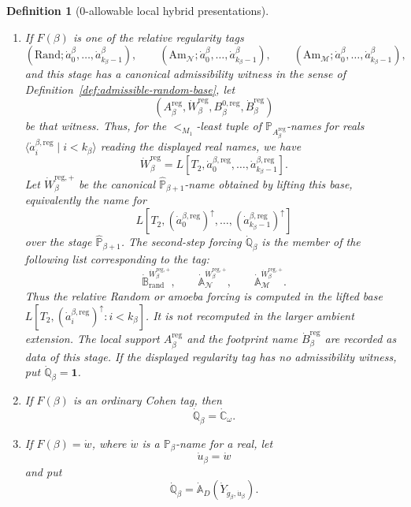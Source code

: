 \documentclass[10pt,a4paper]{amsart}
\newtheorem{definition}{Definition}
\begin{document}
\begin{definition}[\(0\)-allowable local hybrid presentations]
\begin{enumerate}
   \item If \(F(\beta)\) is one of the relative regularity tags
   \[
      (\mathrm{Rand};\dot a^\beta_0,\ldots,
         \dot a^\beta_{k_\beta-1}),
      \qquad
      (\mathrm{Am}_{\mathcal N};\dot a^\beta_0,\ldots,
         \dot a^\beta_{k_\beta-1}),
      \qquad
      (\mathrm{Am}_{\mathcal M};\dot a^\beta_0,\ldots,
         \dot a^\beta_{k_\beta-1}),
   \]
   and this stage has a canonical admissibility witness in the sense of
   Definition~\ref{def:admissible-random-base}, let
   \[
      (A^{\mathrm{reg}}_\beta,
       \dot W^{\mathrm{reg}}_\beta,
       B^{0,\mathrm{reg}}_\beta,
       \dot B^{\mathrm{reg}}_\beta)
   \]
   be that witness.  Thus, for the \(<_{M_1}\)-least tuple of
   \(\mathbb P_{A^{\mathrm{reg}}_\beta}\)-names for reals
   \(\langle\dot a^{\beta,\mathrm{reg}}_i\mid i<k_\beta\rangle\) reading the
   displayed real names, we have
   \[
      \dot W^{\mathrm{reg}}_\beta
      =L[T_2,
          \dot a^{\beta,\mathrm{reg}}_0,
          \ldots,
          \dot a^{\beta,\mathrm{reg}}_{k_\beta-1}].
   \]
   Let \(\dot W^{\mathrm{reg},+}_\beta\) be the canonical
   \(\widehat{\mathbb P}_{\beta+1}\)-name obtained by lifting this base, equivalently
   the name for
   \[
      L[T_2,
        (\dot a^{\beta,\mathrm{reg}}_0)^{\uparrow},\ldots,
        (\dot a^{\beta,\mathrm{reg}}_{k_\beta-1})^{\uparrow}]
   \]
   over the stage \(\widehat{\mathbb P}_{\beta+1}\).  The second-step forcing
   \(\dot{\mathbb Q}_\beta\) is the member of the following list corresponding
   to the tag:
   \[
      \dot{\mathbb B}_{\mathrm{rand}}^{\dot W^{\mathrm{reg},+}_\beta},
      \qquad
      \dot{\mathbb A}_{\mathcal N}^{\dot W^{\mathrm{reg},+}_\beta},
      \qquad
      \dot{\mathbb A}_{\mathcal M}^{\dot W^{\mathrm{reg},+}_\beta}.
   \]
   Thus the relative Random or amoeba forcing is computed in the lifted base
   \(L[T_2,(\dot a^{\beta,\mathrm{reg}}_i)^{\uparrow}:i<k_\beta]\).  It is not
   recomputed in the larger ambient extension.  The local support
   \(A^{\mathrm{reg}}_\beta\) and the footprint name
   \(\dot B^{\mathrm{reg}}_\beta\) are recorded as data of this stage.  If the
   displayed regularity tag has no admissibility witness, put
   \(\dot{\mathbb Q}_\beta=\mathbf 1\).

   \item If \(F(\beta)\) is an ordinary Cohen tag, then
   \[
      \dot{\mathbb Q}_\beta=\dot{\mathbb C}_\omega.
   \]

   \item If \(F(\beta)=\dot w\), where \(\dot w\) is a
   \(\mathbb P_\beta\)-name for a real, let
   \[
      \dot u_\beta=\dot w
   \]
   and put
   \[
      \dot{\mathbb Q}_\beta
      =
      \dot{\mathbb A}_D(\dot Y_{\dot g_\beta,\dot u_\beta}).
   \]


\end{enumerate}
\end{definition}
\end{document}
